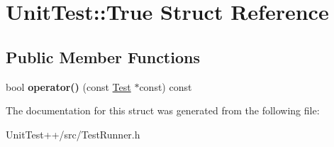 \hypertarget{structUnitTest_1_1True}{\section{Unit\-Test\-:\-:True Struct Reference}
\label{structUnitTest_1_1True}
}
\subsection*{Public Member Functions}
\begin{DoxyCompactItemize}
\item 
\hypertarget{structUnitTest_1_1True_a2d66b2e633f1d049ddf65096f6203e32}{bool {\bfseries operator()} (const \hyperlink{classUnitTest_1_1Test}{Test} $\ast$const) const }\label{structUnitTest_1_1True_a2d66b2e633f1d049ddf65096f6203e32}

\end{DoxyCompactItemize}


The documentation for this struct was generated from the following file\-:\begin{DoxyCompactItemize}
\item 
Unit\-Test++/src/Test\-Runner.\-h\end{DoxyCompactItemize}
